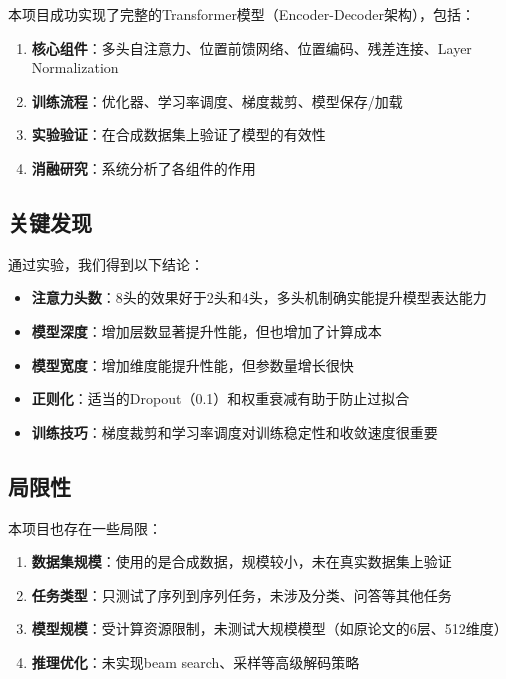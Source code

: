 \documentclass[UTF8,12pt,a4paper]{ctexart}
\begin{document}
本项目成功实现了完整的Transformer模型（Encoder-Decoder架构），包括：

\begin{enumerate}
    \item \textbf{核心组件}：多头自注意力、位置前馈网络、位置编码、残差连接、Layer Normalization
    \item \textbf{训练流程}：优化器、学习率调度、梯度裁剪、模型保存/加载
    \item \textbf{实验验证}：在合成数据集上验证了模型的有效性
    \item \textbf{消融研究}：系统分析了各组件的作用
\end{enumerate}

\subsection{关键发现}

通过实验，我们得到以下结论：

\begin{itemize}
    \item \textbf{注意力头数}：8头的效果好于2头和4头，多头机制确实能提升模型表达能力
    \item \textbf{模型深度}：增加层数显著提升性能，但也增加了计算成本
    \item \textbf{模型宽度}：增加维度能提升性能，但参数量增长很快
    \item \textbf{正则化}：适当的Dropout（0.1）和权重衰减有助于防止过拟合
    \item \textbf{训练技巧}：梯度裁剪和学习率调度对训练稳定性和收敛速度很重要
\end{itemize}

\subsection{局限性}

本项目也存在一些局限：

\begin{enumerate}
    \item \textbf{数据集规模}：使用的是合成数据，规模较小，未在真实数据集上验证
    \item \textbf{任务类型}：只测试了序列到序列任务，未涉及分类、问答等其他任务
    \item \textbf{模型规模}：受计算资源限制，未测试大规模模型（如原论文的6层、512维度）
    \item \textbf{推理优化}：未实现beam search、采样等高级解码策略
\end{enumerate}
\end{document}
